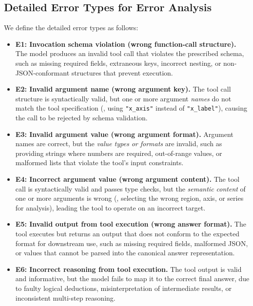\subsection{Detailed Error Types for Error Analysis}
\label{app:error}
We define the detailed error types as follows:
\begin{itemize}
    \item \textbf{E1: Invocation schema violation (wrong function-call structure).} The model produces an invalid tool call that violates the prescribed schema, such as missing required fields, extraneous keys, incorrect nesting, or non-JSON-conformant structures that prevent execution.
    \item \textbf{E2: Invalid argument name (wrong argument key).} The tool call structure is syntactically valid, but one or more argument \emph{names} do not match the tool specification (\eg, using \texttt{"x\_axis"} instead of \texttt{"x\_label"}), causing the call to be rejected by schema validation.
    \item \textbf{E3: Invalid argument value (wrong argument format).} Argument names are correct, but the \emph{value types or formats} are invalid, such as providing strings where numbers are required, out-of-range values, or malformed lists that violate the tool’s input constraints.
    \item \textbf{E4: Incorrect argument value (wrong argument content).} The tool call is syntactically valid and passes type checks, but the \emph{semantic content} of one or more arguments is wrong (\eg, selecting the wrong region, axis, or series for analysis), leading the tool to operate on an incorrect target.
    \item \textbf{E5: Invalid output from tool execution (wrong answer format).} The tool executes but returns an output that does not conform to the expected format for downstream use, such as missing required fields, malformed JSON, or values that cannot be parsed into the canonical answer representation.
    \item \textbf{E6: Incorrect reasoning from tool execution.} The tool output is valid and informative, but the model fails to map it to the correct final answer, due to faulty logical deductions, misinterpretation of intermediate results, or inconsistent multi-step reasoning.
\end{itemize}

